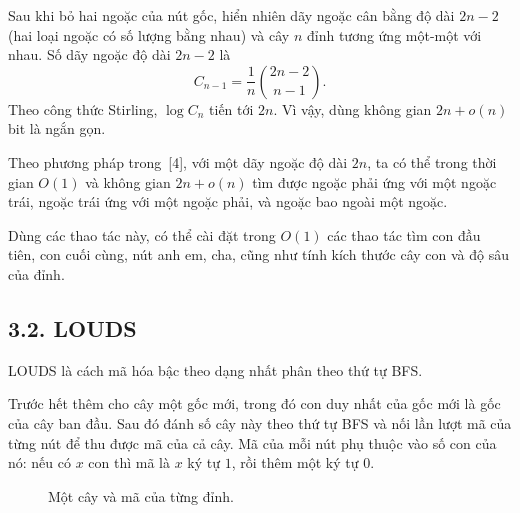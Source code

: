 \documentclass[11pt]{article}
\begin{document}
Sau khi bỏ hai ngoặc của nút gốc, hiển nhiên dãy ngoặc cân bằng độ dài
\(2n-2\) (hai loại ngoặc có số lượng bằng nhau) và cây \(n\) đỉnh tương ứng
một-một với nhau. Số dãy ngoặc độ dài \(2n-2\) là
\[
  C_{n-1}=\frac1n\binom{2n-2}{n-1}.
\]
Theo công thức Stirling, \(\log C_n\) tiến tới \(2n\). Vì vậy, dùng không gian
\(2n+o(n)\) bit là ngắn gọn.

Theo phương pháp trong~[4], với một dãy ngoặc độ dài \(2n\), ta có thể trong
thời gian \(O(1)\) và không gian \(2n+o(n)\) tìm được ngoặc phải ứng với một
ngoặc trái, ngoặc trái ứng với một ngoặc phải, và ngoặc bao ngoài một ngoặc.

Dùng các thao tác này, có thể cài đặt trong \(O(1)\) các thao tác tìm con đầu
tiên, con cuối cùng, nút anh em, cha, cũng như tính kích thước cây con và độ
sâu của đỉnh.

\subsection*{3.2. LOUDS}

LOUDS là cách mã hóa bậc theo dạng nhất phân theo thứ tự BFS.

Trước hết thêm cho cây một gốc mới, trong đó con duy nhất của gốc mới là gốc
của cây ban đầu. Sau đó đánh số cây này theo thứ tự BFS và nối lần lượt mã
của từng nút để thu được mã của cả cây. Mã của mỗi nút phụ thuộc vào số con
của nó: nếu có \(x\) con thì mã là \(x\) ký tự \(1\), rồi thêm một ký tự
\(0\).

\begin{figure}[ht]
\centering
{}
\caption{Một cây và mã của từng đỉnh.}
\end{figure}
\end{document}
